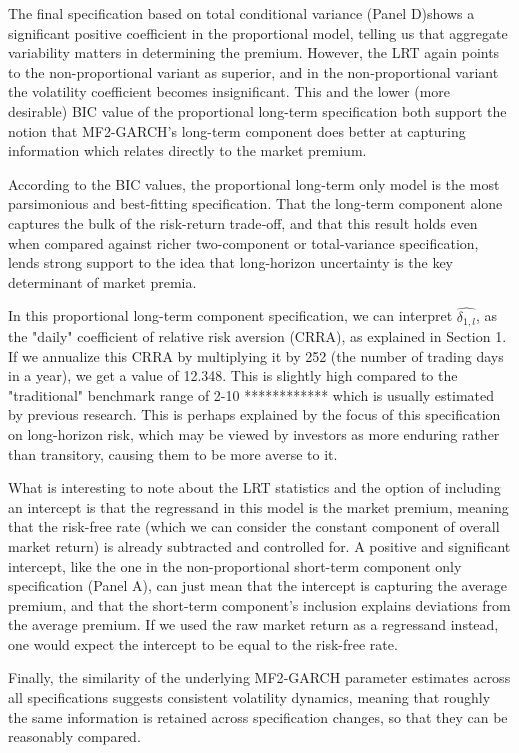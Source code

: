 \documentclass[12pt]{article}
\begin{document}
The final specification based on total conditional variance (Panel D)shows a significant positive coefficient in the proportional model, telling us that aggregate variability matters in determining the premium. However, the LRT again points to the non-proportional variant as superior, and in the non‑proportional variant the volatility coefficient becomes insignificant. This and the lower (more desirable) BIC value of the proportional long-term specification both support the notion that MF2-GARCH's long-term component does better at capturing information which relates directly to the market premium.\par
According to the BIC values, the proportional long‑term only model is the most parsimonious and best‐fitting specification. That the long‑term component alone captures the bulk of the risk-return trade‑off, and that this result holds even when compared against richer two-component or total-variance specification, lends strong support to the idea that long-horizon uncertainty is the key determinant of market premia. \par
In this proportional long-term component specification, we can interpret $\widehat{\delta_{1,l}}$, as the "daily" coefficient of relative risk aversion (CRRA), as explained in Section 1. If we annualize this CRRA by multiplying it by 252 (the number of trading days in a year), we get a value of 12.348. This is slightly high compared to the "traditional" benchmark range of 2-10 ************ which is usually estimated by previous research. This is perhaps explained by the focus of this specification on long-horizon risk, which may be viewed by investors as more enduring rather than transitory, causing them to be more averse to it.\par
What is interesting to note about the LRT statistics and the option of including an intercept is that the regressand in this model is the market premium, meaning that the risk-free rate (which we can consider the constant component of overall market return) is already subtracted and controlled for. A positive and significant intercept, like the one in the non-proportional short-term component only specification (Panel A), can just mean that the intercept is capturing the average premium, and that the short-term component's inclusion explains deviations from the average premium. If we used the raw market return as a regressand instead, one would expect the intercept to be equal to the risk-free rate.\par
Finally, the similarity of the underlying MF2‑GARCH  parameter estimates across all specifications suggests consistent volatility dynamics, meaning that roughly the same information is retained across specification changes, so that they can be reasonably compared.
\end{document}
